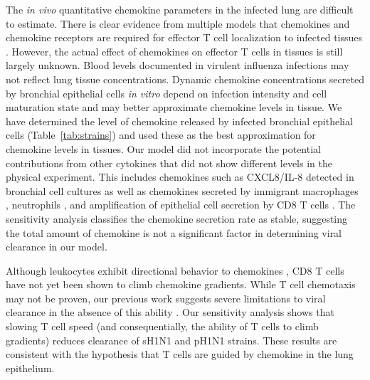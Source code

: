 \documentclass[preprint,10pt,numbers]{elsarticle}
\newcommand{\removed}[1]{}
\newcommand{\new}[1]{#1}
\begin{document}
The \textit{in vivo} quantitative chemokine parameters in the infected lung are difficult to estimate.  There is clear evidence from multiple models that chemokines and chemokine receptors are required for effector T cell localization to infected tissues \citep{Christensen2004, Christensen2006, Dawson2000, DeLemos2005, Fadel2008, Gadhamsetty2014, Groom2011a, Groom2011, Hsieh2006, Klein2005, Kohlmeier2009, Kohlmeier2011, Thapa2008, Wareing2004, Wuest2008, Pawelek2012}. However, the actual effect of chemokines on effector T cells in tissues is still largely unknown.  Blood levels documented in virulent influenza infections \citep{DeJong2006} may not reflect lung tissue concentrations.  Dynamic chemokine concentrations secreted by bronchial epithelial cells \textit{in vitro} depend on infection intensity and cell maturation state \citep{Mitchell2011, Chan2010, Chan2005, Zeng2011} and may better approximate chemokine levels in tissue.  We have determined the level of chemokine released by infected bronchial epithelial cells (Table~\ref{tab:strains}) and used these as the best approximation for chemokine levels in tissues.  Our model did not incorporate  the potential contributions from other cytokines that did not show different levels in the physical experiment.  This includes chemokines such as CXCL8/IL-8 detected in bronchial cell cultures \citep{Matsukura1996, Arndt2002} as well as chemokines secreted by immigrant macrophages \citep{Julkunen2000}, neutrophils \citep{lim2015neutrophil}, and amplification of epithelial cell secretion by CD8 T cells \citep{Zhao2000}.  The sensitivity analysis classifies the chemokine secretion rate as stable, suggesting the total amount of chemokine is not a significant factor in determining viral clearance in our model.  

Although leukocytes exhibit directional behavior to chemokines \citep{LiJeon2002, McDonald2010}, CD8 T cells have not yet been shown to climb chemokine gradients.   While T cell chemotaxis may not be proven, our previous work \removed{has shown}\new{suggests} severe limitations to viral clearance in the absence of this ability \citep{Banerjee2011}.  Our sensitivity analysis shows that slowing T cell speed (and consequentially, the ability of T cells to climb gradients) reduces clearance of sH1N1 and pH1N1 strains.   These results are consistent with the hypothesis that T cells are guided by chemokine in the lung epithelium.

\end{document}
